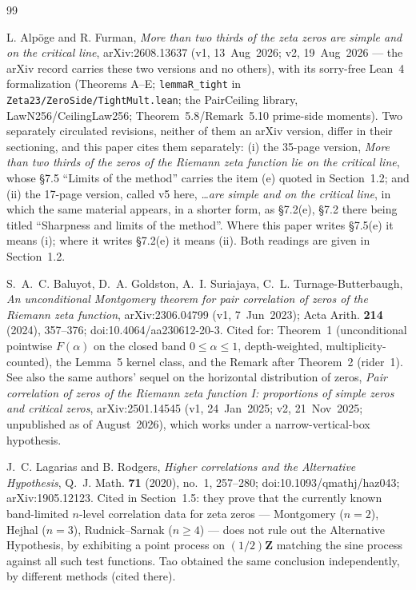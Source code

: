 \documentclass[11pt]{article}
\theoremstyle{plain}
\theoremstyle{definition}
\theoremstyle{remark}
\newcommand{\Z}{\mathbf{Z}}
\begin{document}
\begin{thebibliography}{99}

 L. Alp\"oge and R. Furman, \emph{More than two thirds of
the zeta zeros are simple and on the critical line}, arXiv:2608.13637 (v1, 13~Aug~2026;
v2, 19~Aug~2026 --- the arXiv record carries these two versions and no others),
with its sorry-free Lean~4 formalization
(Theorems A--E; \texttt{lemmaR\_tight} in
\texttt{Zeta23/ZeroSide/TightMult.lean}; the PairCeiling library,
LawN256/CeilingLaw256; Theorem~5.8/Remark~5.10 prime-side moments).
Two separately circulated revisions, neither of them an arXiv version, differ in
their sectioning, and this paper cites them separately:
(i) the 35-page version, \emph{More than two thirds of the zeros of the Riemann
zeta function lie on the critical line}, whose
\S7.5 ``Limits of the method'' carries the item (e) quoted in
Section~1.2; and
(ii) the 17-page version, called v5 here, \emph{\ldots are simple and on the
critical line}, in which the same material appears,
in a shorter form, as \S7.2(e), \S7.2 there being titled ``Sharpness and limits
of the method''. Where this paper writes \S7.5(e) it means (i); where it writes
\S7.2(e) it means (ii). Both readings are given in Section~1.2.

 S.~A.~C. Baluyot, D.~A. Goldston, A.~I. Suriajaya,
C.~L. Turnage-Butterbaugh, \emph{An unconditional Montgomery theorem for pair
correlation of zeros of the Riemann zeta function}, arXiv:2306.04799
(v1, 7~Jun~2023); Acta Arith. \textbf{214} (2024), 357--376;
doi:10.4064/aa230612-20-3. Cited for: Theorem~1 (unconditional pointwise
$F(\alpha)$ on the closed band $0 \le \alpha \le 1$, depth-weighted,
multiplicity-counted), the Lemma~5 kernel class, and the Remark after
Theorem~2 (rider~1). See also the same authors' sequel on the horizontal
distribution of zeros, \emph{Pair correlation of zeros of the Riemann zeta
function I: proportions of simple zeros and critical zeros}, arXiv:2501.14545
(v1, 24~Jan~2025; v2, 21~Nov~2025; unpublished as of August~2026), which works
under a narrow-vertical-box hypothesis.

 J.~C. Lagarias and B. Rodgers, \emph{Higher correlations
and the Alternative Hypothesis}, Q.~J. Math. \textbf{71} (2020), no.~1,
257--280; doi:10.1093/qmathj/haz043; arXiv:1905.12123. Cited in
Section~1.5: they prove that the currently known band-limited $n$-level
correlation data for zeta zeros --- Montgomery ($n = 2$), Hejhal ($n = 3$),
Rudnick--Sarnak ($n \ge 4$) --- does not rule out the Alternative
Hypothesis, by exhibiting a point process on $(1/2)\Z$ matching the sine process
against all such test functions. Tao obtained the same conclusion independently,
by different methods (cited there).


\end{thebibliography}
\end{document}
